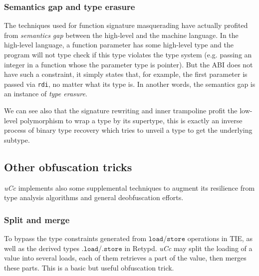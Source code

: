 \documentclass[compsoc,conference,a4paper,10pt,times]{IEEEtran}
\begin{document}
\subsubsection*{Semantics gap and type erasure}
The techniques used for function signature masquerading have actually profited from \emph{semantics gap}
between the high-level and the machine language. In the high-level language, a function parameter
has some high-level type and the program will not type check if this type violates the type system
(e.g. passing an integer in a function whose the parameter type is pointer). But the ABI does not
have such a constraint, it simply states that, for example, the first parameter is passed via \texttt{rdi},
no matter what its type is. In another words, the semantics gap is an instance of \emph{type erasure}.

We can see also that the signature rewriting and inner trampoline profit the
low-level polymorphism to wrap a type by its supertype, this is exactly an inverse process of binary type
recovery which tries to unveil a type to get the underlying subtype.


\subsection{Other obfuscation tricks}
\noindent
\emph{uCc} implements also some supplemental techniques to augment its resilience from type analysis algorithms
and general deobfuscation efforts.

\subsubsection*{Split and merge}
To bypass the type constraints generated from $\mathtt{load}$/$\mathtt{store}$ operations in TIE, as well as
the derived types $\mathtt{.load}$/$\mathtt{.store}$ in Retypd. \emph{uCc}
may split the loading of a value into several loads, each of them retrieves a part of the value, then merges these
parts. This is a basic but useful obfuscation trick.
\end{document}
